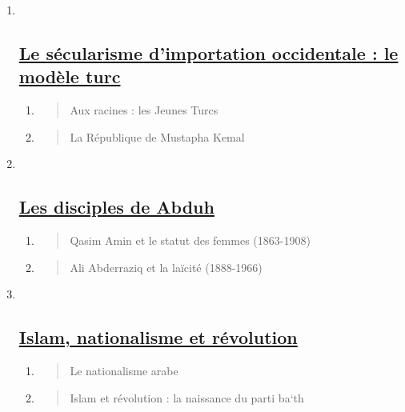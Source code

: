 \begin{enumerate}
\def\labelenumi{\Roman{enumi}.}
\item ~
  \hypertarget{le-suxe9cularisme-dimportation-occidentale-le-moduxe8le-turc}{%
  \subsection{\texorpdfstring{\underline{Le sécularisme d'importation
  occidentale : le modèle
  turc}}{Le sécularisme d'importation occidentale : le modèle turc}}\label{le-suxe9cularisme-dimportation-occidentale-le-moduxe8le-turc}}

  \begin{enumerate}
  \def\labelenumii{\arabic{enumii}.}
  \item
    \begin{quote}
    Aux racines : les Jeunes Turcs
    \end{quote}
  \item
    \begin{quote}
    La République de Mustapha Kemal
    \end{quote}
  \end{enumerate}
\item ~
  \hypertarget{les-disciples-de-abduh}{%
  \subsection{\texorpdfstring{\underline{Les disciples de
  Abduh}}{Les disciples de Abduh}}\label{les-disciples-de-abduh}}

  \begin{enumerate}
  \def\labelenumii{\arabic{enumii}.}
  \item
    \begin{quote}
    Qasim Amin et le statut des femmes (1863-1908)
    \end{quote}
  \item
    \begin{quote}
    Ali Abderraziq et la laïcité (1888-1966)
    \end{quote}
  \end{enumerate}
\item ~
  \hypertarget{islam-nationalisme-et-ruxe9volution}{%
  \subsection{\texorpdfstring{\underline{Islam, nationalisme et
  révolution}}{Islam, nationalisme et révolution}}\label{islam-nationalisme-et-ruxe9volution}}

  \begin{enumerate}
  \def\labelenumii{\arabic{enumii}.}
  \item
    \begin{quote}
    Le nationalisme arabe
    \end{quote}
  \item
    \begin{quote}
    Islam et révolution : la naissance du parti ba`th
    \end{quote}
  \end{enumerate}
\end{enumerate}

